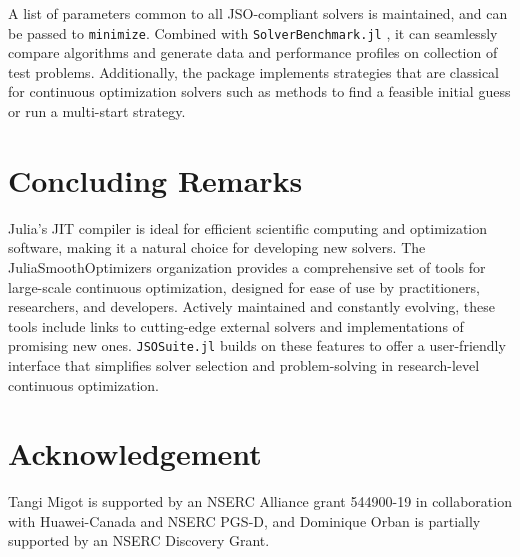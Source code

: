 \documentclass{juliacon}
\begin{document}
A list of parameters common to all JSO-compliant solvers is maintained, and can be passed to \texttt{minimize}.
%
Combined with \texttt{SolverBenchmark.jl} \cite{orban-siqueira-solverbenchmark-2020}, it can seamlessly compare algorithms and generate data and performance profiles on collection of test problems.
Additionally, the package implements strategies that are classical for continuous optimization solvers such as methods to find a feasible initial guess or run a multi-start strategy.

\section{Concluding Remarks}

Julia’s JIT compiler is ideal for efficient scientific computing and optimization software, making it a natural choice for developing new solvers.
%
The JuliaSmoothOptimizers organization provides a comprehensive set of tools for large-scale continuous optimization, designed for ease of use by practitioners, researchers, and developers.
%
Actively maintained and constantly evolving, these tools include links to cutting-edge external solvers and implementations of promising new ones. 
%
\texttt{JSOSuite.jl} builds on these features to offer a user-friendly interface that simplifies solver selection and problem-solving in research-level continuous optimization.

\section*{Acknowledgement}

Tangi Migot is supported by an NSERC Alliance grant 544900-19 in collaboration with Huawei-Canada and NSERC PGS-D,
and Dominique Orban is partially supported by an NSERC Discovery Grant.


\end{document}
